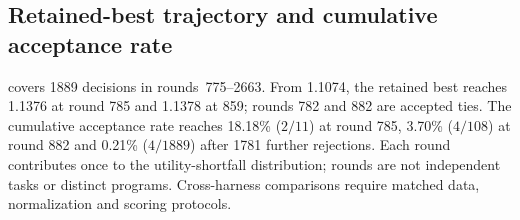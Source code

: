 \subsection{Retained-best trajectory and cumulative acceptance rate}\label{app:acceptance-over-rounds}\label{app:record-windows}

 covers \num{1889} decisions in
rounds~775--2663. From \num{1.1074}, the retained best reaches \num{1.1376} at round
785 and \num{1.1378} at 859; rounds 782 and 882 are accepted ties.
The cumulative acceptance rate reaches 18.18\% ($2/11$) at round 785,
3.70\% ($4/108$) at round 882 and 0.21\% ($4/\num{1889}$) after
\num{1781} further rejections. Each round contributes once to the
utility-shortfall distribution; rounds are not independent tasks or
distinct programs. Cross-harness comparisons require matched data,
normalization and scoring protocols.
